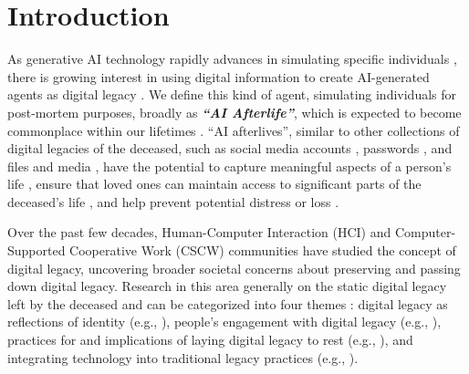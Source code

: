\section{Introduction}

As generative AI technology rapidly advances in simulating specific individuals \cite{achiam2023gpt, anil2023palm, abramson2020creating, Eren_Coqui_TTS_2021, zhang2023sadtalker, la2024open, pataranutaporn2023living}, there is growing interest in using digital information to create AI-generated agents as digital legacy \cite{morris2024generative, brubaker2024ai}. 
We define this kind of agent, simulating individuals for post-mortem purposes, broadly as \textbf{\textit{``AI Afterlife''}}, which is expected to become commonplace within our lifetimes \cite{morris2024generative}. 
\label{definition of AI Afterlives}
``AI afterlives'', similar to other collections of digital legacies of the deceased, such as social media accounts \cite{ohman2019dead, gach2021getting}, passwords \cite{holt2021personal,ferreira2011password}, and files and media \cite{pfister2017will}, have the potential to capture meaningful aspects of a person’s life \cite{hunter2008beyond, gach2021getting}, ensure that loved ones can maintain access to significant parts of the deceased's life \cite{jung2023bereaved, kim2024maintaining, brubaker2024ai}, and help prevent potential distress or loss \cite{chen2021happens}.

Over the past few decades, Human-Computer Interaction (HCI) and Computer-Supported Cooperative Work (CSCW) communities have studied the concept of digital legacy, uncovering broader societal concerns about preserving and passing down digital legacy. Research in this area generally  on the static digital legacy left by the deceased and can be categorized into four themes \cite{doyle2023digital}: digital legacy as reflections of identity (e.g., \cite{gulotta2014legacy, kaye2006have, thomas2014older}), people's engagement with digital legacy (e.g., \cite{gach2020experiences, massimi2011matters, brubaker2014stewarding, brubaker2016legacy}), practices for and implications of laying digital legacy to rest (e.g., \cite{gulotta2016engaging, kirk2010human, jamison2016ps}), and integrating technology into traditional legacy practices (e.g., \cite{odom2012technology, uriu2021floral, uriu2021generating}).


